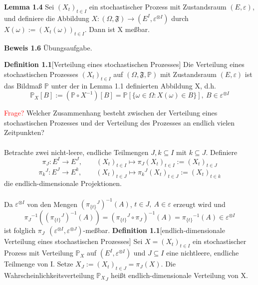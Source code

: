 \textbf{Lemma 1.4}
Sei $(X_{t})_{t\in I}$ ein stochastischer Prozess mit Zustandsraum $(E,\varepsilon)$, und definiere die Abbildung $X:(\Omega,\mathfrak{F}) \to (E^{I},\varepsilon^{ \otimes I})$ durch $X(\omega) := (X_{t}(\omega))_{t\in I} $. 
Dann ist X meßbar. 

\textbf{Beweis 1.6}
Übungsaufgabe.

\noindent 

\textbf{Definition 1.1}[Verteilung eines stochastischen Prozesses]
Die Verteilung eines stochastischen Prozesses $(X_{t})_{t\in I}$ auf $(\Omega, \mathfrak{F}, \mathbb{P})$ mit Zustandsraum $(E, \varepsilon)$ ist das Bildmaß $\mathbb{P}$ unter der in Lemma 1.1 definierten Abbildung X, d.h.
\begin{equation*} 
{{\mathbb{P}}_{X}}[B] := (\mathbb{P} \circ X^{-1})[B] = \mathbb{P}[ \lbrace \omega \in \Omega : X(\omega) \in B\rbrace] , \: B \in \varepsilon^{ \otimes I}
\end{equation*}

\noindent
\textcolor{red}{Frage?} Welcher Zusammenhang besteht zwischen der Verteilung eines stochastischen Prozesses und der Verteilung des Prozesses an endlich vielen Zeitpunkten?
\\
\\
Betrachte zwei nicht-leere, endliche Teilmengen $J,k \subseteq I$ mit $k \subseteq J$. Definiere
\begin{equation*}
\pi_{J}: E^{I} \to E^{J}, \qquad  {(X_{t})}_{t\in I} \mapsto \pi_{J}{(X_{t})}_{t\in I}:= {(X_{t})}_{t\in J}
\end{equation*}
\begin{equation*}
{\pi_{k}}^{J}: E^{J} \to E^{k}, \qquad  {(X_{t})}_{t\in J} \mapsto {\pi_{k}}^{J}{(X_{t})}_{t\in J}:= {(X_{t})}_{t\in k}
\end{equation*}
die endlich-dimensionale Projektionen.
\\
\\
Da $\varepsilon^{ \otimes I}$ von den Mengen ${({\pi_{\lbrace t \rbrace}}^{J})}^{-1}(A)$, $t \in J, \: A \in \varepsilon$ erzeugt wird und
\begin{equation*}
{\pi_{J}}^{-1}({({\pi_{\lbrace t \rbrace}}^{J})}^{-1}(A)) = {({\pi_{\lbrace t \rbrace}}^{J} \circ \pi_{J})}^{-1}(A) = {\pi_{\lbrace t \rbrace}}^{-1}(A) \in \varepsilon^{ \otimes I} 
\end{equation*}
ist folglich $\pi_{J} \: \:  (\varepsilon^{ \otimes I}, \varepsilon^{ \otimes J})$-meßbar.
\textbf{Definition 1.1}[endlich-dimensionale Verteilung eines stochastischen Prozesses]
Sei $X = {(X_{t})}_{t\in I}$ ein stochastischer Prozess mit Verteilung ${\mathbb{P}}_X$ auf $(E^{I},\varepsilon^{ \otimes I})$ und $J \subseteq I$ eine nichtleere, endliche Teilmenge von I. Setze $X_{J} := {(X_{t})}_{t\in J} = \pi_{J}(X)$. Die Wahrscheinlichkeitsverteilung ${{\mathbb{P}}_X}_{J}$ heißt endlich-dimensionale Verteilung von X.

